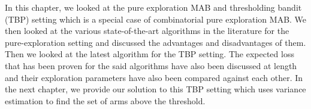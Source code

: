 In this chapter, we looked at the pure exploration MAB and thresholding bandit (TBP) setting which is a special case of combinatorial pure exploration MAB. We then looked at the various state-of-the-art algorithms in the literature for the pure-exploration setting and discussed the advantages and disadvantages of them. Then we looked at the latest algorithm for the TBP setting. The expected loss that has been proven for the said algorithms have also been discussed at length and their exploration parameters have also been compared against each other. In the next chapter, we provide our solution to this TBP setting which uses variance estimation to find the set of arms above the threshold.